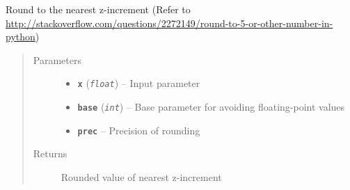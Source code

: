 \documentclass[letterpaper,10pt,english]{sphinxmanual}
\begin{document}
\begin{fulllineitems}
\label{hyvr:hyvr.hyvr.utils.round_x}
Round to the nearest z-increment (Refer to \url{http://stackoverflow.com/questions/2272149/round-to-5-or-other-number-in-python})
\begin{quote}\begin{description}
\item[{Parameters}] \leavevmode\begin{itemize}
\item {} 
\textbf{\texttt{x}} (\emph{\texttt{float}}) -- Input parameter

\item {} 
\textbf{\texttt{base}} (\emph{\texttt{int}}) -- Base parameter for avoiding floating-point values

\item {} 
\textbf{\texttt{prec}} -- Precision of rounding

\end{itemize}

\item[{Returns}] \leavevmode
Rounded value of nearest z-increment

\end{description}\end{quote}

\end{fulllineitems}

\end{document}
